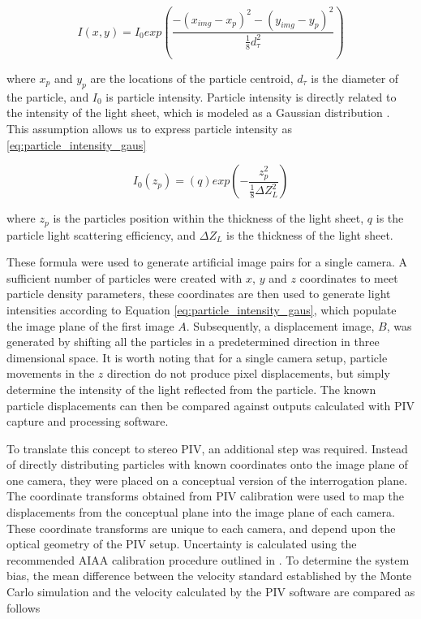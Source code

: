 \begin{equation}
	I(x,y) = I_0exp \left( \frac{-(x_{img} - x_p)^2 - (y_{img} - y_p)^2}
	{\frac{1}{8}d_\tau^2} \right)
	\label{eq:piv_gaussian_uncertainty}
\end{equation}

where $x_p$ and $y_p$ are the locations of the particle centroid, $d_\tau$ is 
the diameter of the particle, and $I_0$ is particle intensity. Particle 
intensity is directly related to the intensity of the light sheet, which is 
modeled as a Gaussian distribution \cite{PIVuncertAIAA}. This assumption allows 
us 
to express particle intensity as \ref{eq:particle_intensity_gaus}

\begin{equation}
	I_0(z_p) = (q)exp\left(- \frac{z_p^2}{\frac{1}{8}\Delta Z_L^2}\right)
	\label{eq:particle_intensity_gaus}
\end{equation}

where $z_p$ is the particles position within the thickness of the light sheet, 
$q$ is the particle light scattering efficiency, and $\Delta Z_L$ is the 
thickness of the light sheet.

These formula were used to generate artificial image pairs for a single camera. 
A sufficient number of particles were created with $x$, $y$ and $z$ coordinates 
to meet particle density parameters, these coordinates are then 
used to generate light intensities according to Equation 
\ref{eq:particle_intensity_gaus}, which populate the image plane of the first 
image $A$. Subsequently, a displacement image, $B$, was generated by shifting 
all the 
particles in a predetermined direction in three dimensional space. It is worth 
noting that for a single camera setup, particle movements in the $z$ direction 
do not produce pixel displacements, but simply determine the intensity of the 
light reflected from the particle. The known particle displacements can then be 
compared against outputs calculated with PIV capture and processing software.

To translate this concept to stereo PIV, an additional step was required. 
Instead of directly distributing particles with known coordinates onto the 
image 
plane of one camera, they were placed on a conceptual version of the 
interrogation plane. The coordinate transforms obtained from PIV calibration 
were used to map the displacements from the conceptual plane into the image 
plane of each camera. These coordinate transforms are unique to each camera, 
and depend upon the optical geometry of the PIV setup. Uncertainty is 
calculated using the recommended AIAA calibration procedure outlined in 
\cite{PIVuncertAIAA}. To determine the system bias, the mean difference between 
the velocity standard established by the Monte Carlo simulation and the 
velocity calculated by the PIV software are compared as follows

